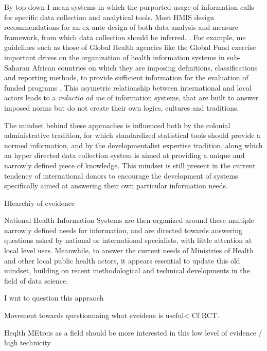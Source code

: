 By top-down I mean systems in which the purported usage of information calls for specific data collection and analytical tools. Most HMIS design recommendations for an ex-ante design of both data analysis and measure framework, from which data collection should be inferred. \citep{lippeveld_routine_2000,rhino_introducing_2003,daltilia_systeme_2005,health_metrics_network_framework_2008}. For example, \gls{me} guidelines such as those of Global Health agencies like the Global Fund exercise important drives on the organization of health information systems in sub-Saharan African countries on which they are imposing definitions, classifications and reporting methods, to provide sufficient information for the evaluation of funded programs \citep{the_global_fund_global_2014}. This asymetric relationship between international and local actors leads to a    \textit{reductio ad \gls{me}} of information systems, that are built to answer imposed norms but do not create their own logics, cultures and traditions.

The mindset behind these approaches is influenced both by the colonial administrative tradition, for which standardized statistical tools should provide a normed information, and by the developmentalist expertise tradition, along which an hyper directed data collection system is aimed at providing a unique and narrowly defined piece of knowledge. This mindset is still present in the current tendency of international donors to encourage the development of systems specifically aimed at answering their own particular information needs.


HIearchiy of eveidence

National Health Information Systems are then organized around these multiple narrowly defined needs for information, and are directed towards answering questions asked by national or international specialists, with little attention at local level uses. Meanwhile, to answer the current needs of Ministries of Health and other local public health actors, it appears essential to update this old mindset, building on recent methodological and technical developments in the field of data science.


I wnt to question this appraoch

Movement towards qurstionnaing what eveidene is useful< Cf RCT.

Heqlth MEtrcis as a field should be more interested in this low level of evidence / high technicity


